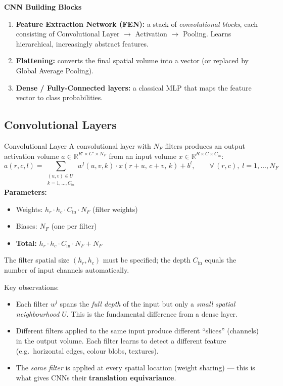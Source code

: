 \documentclass[11pt,a4paper]{article}
\newcommand{\term}[1]{\textcolor{DefGreen}{\textbf{#1}}\index{#1}}
\begin{document}
\begin{tcolorbox}[colback=LightBlue,colframe=AccentBlue,boxrule=0.8pt,arc=3pt]
\textbf{CNN Building Blocks}\\[4pt]
\begin{enumerate}
  \item \textbf{Feature Extraction Network (FEN):} a stack of \emph{convolutional blocks}, each consisting of Convolutional Layer $\to$ Activation $\to$ Pooling. Learns hierarchical, increasingly abstract features.
  \item \textbf{Flattening:} converts the final spatial volume into a vector (or replaced by Global Average Pooling).
  \item \textbf{Dense / Fully-Connected layers:} a classical MLP that maps the feature vector to class probabilities.
\end{enumerate}
\end{tcolorbox}

\subsection{Convolutional Layers}
\label{sec:conv_layers}

\begin{defbox}{Convolutional Layer}
A convolutional layer with $N_F$ filters produces an output activation volume $a \in \mathbb{R}^{R' \times C' \times N_F}$ from an input volume $x \in \mathbb{R}^{R \times C \times C_\text{in}}$:
\[
a(r,c,l) = \sum_{\substack{(u,v)\in U \\ k=1,\ldots,C_\text{in}}} w^l(u,v,k)\cdot x(r+u,\,c+v,\,k) + b^l, \qquad \forall\,(r,c),\; l=1,\ldots,N_F
\]
\textbf{Parameters:}
\begin{itemize}
  \item Weights: $h_r \cdot h_c \cdot C_\text{in} \cdot N_F$ (filter weights)
  \item Biases: $N_F$ (one per filter)
  \item \textbf{Total:} $h_r \cdot h_c \cdot C_\text{in} \cdot N_F + N_F$
\end{itemize}
The filter spatial size $(h_r, h_c)$ must be specified; the depth $C_\text{in}$ equals the number of input channels automatically.
\end{defbox}

Key observations:
\begin{itemize}
  \item Each filter $w^l$ spans the \emph{full depth} of the input but only a \emph{small spatial neighbourhood} $U$. This is the fundamental difference from a dense layer.
  \item Different filters applied to the same input produce different ``slices'' (channels) in the output volume. Each filter learns to detect a different feature (e.g.\ horizontal edges, colour blobs, textures).
  \item The \emph{same filter} is applied at every spatial location (weight sharing) — this is what gives CNNs their \term{translation equivariance}.
\end{itemize}
\end{document}
